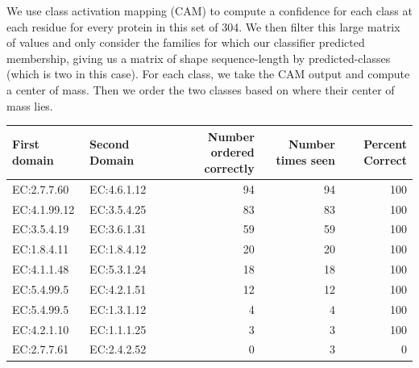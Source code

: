 We use class activation mapping (CAM) to compute a confidence for each class at each residue for every protein in this set of 304. We then filter this large matrix of values and only consider the families for which our classifier predicted membership, giving us a matrix of shape sequence-length by predicted-classes (which is two in this case). For each class, we take the CAM output and compute a center of mass. Then we order the two classes based on where their center of mass lies.

\begin{table}[htbp]
\begin{tabular}{|l|l|r|r|r|}
\hline
First domain & Second Domain & Number ordered correctly & Number times seen & Percent Correct \\
\hline
EC:2.7.7.60  & EC:4.6.1.12   & 94                                           & 94                                       & 100                                 \\
\hline
EC:4.1.99.12 & EC:3.5.4.25   & 83                                           & 83                                       & 100                                 \\
\hline
EC:3.5.4.19  & EC:3.6.1.31   & 59                                           & 59                                       & 100                                 \\
\hline
EC:1.8.4.11  & EC:1.8.4.12   & 20                                           & 20                                       & 100                                 \\
\hline
EC:4.1.1.48  & EC:5.3.1.24   & 18                                           & 18                                       & 100                                 \\
\hline
EC:5.4.99.5  & EC:4.2.1.51   & 12                                           & 12                                       & 100                                 \\
\hline
EC:5.4.99.5  & EC:1.3.1.12   & 4                                            & 4                                        & 100                                 \\
\hline
EC:4.2.1.10  & EC:1.1.1.25   & 3                                            & 3                                        & 100                                 \\
\hline
EC:2.7.7.61  & EC:2.4.2.52   & 0                                            & 3                                        & 0                                   \\

\end{tabular}
\end{table}
